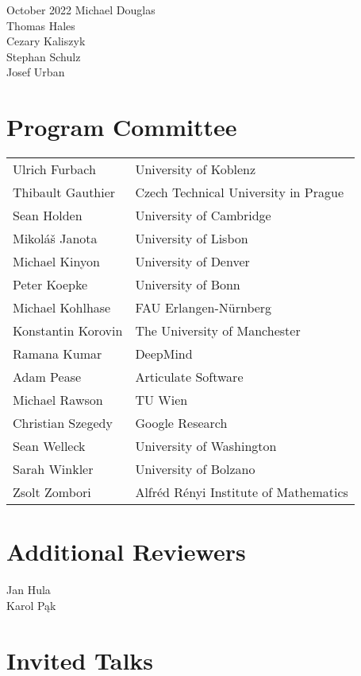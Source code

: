 \documentclass[a4paper]{llncs}
\begin{document}
\begin{flushright}
  \noindent October 2022\hfill
Michael Douglas\\
Thomas Hales\\
Cezary Kaliszyk\\
Stephan Schulz\\
Josef Urban
\end{flushright}

\clearpage

\section*{Program Committee}
\begin{longtable}{p{}p{}}
Ulrich Furbach   	&University of Koblenz\\
Thibault Gauthier	&Czech Technical University in Prague\\
Sean Holden     	&University of Cambridge\\
Mikoláš Janota   	&University of Lisbon\\
Michael Kinyon   	&University of Denver\\
Peter Koepke    	&University of Bonn\\
Michael Kohlhase	&FAU Erlangen-Nürnberg\\
Konstantin Korovin	&The University of Manchester\\
Ramana Kumar    	&DeepMind\\
Adam Pease      	&Articulate Software\\
Michael Rawson   	&TU Wien\\
Christian Szegedy	&Google Research\\
Sean Welleck     	&University of Washington\\
Sarah Winkler    	&University of Bolzano\\
Zsolt Zombori   	&Alfréd Rényi Institute of Mathematics\\
\end{longtable}

\section*{Additional Reviewers}
\begin{multicols}{2}
  \noindent
  Jan Hula \\
  Karol P\k{a}k
\end{multicols}

\clearpage

\section*{Invited Talks}
\end{document}
